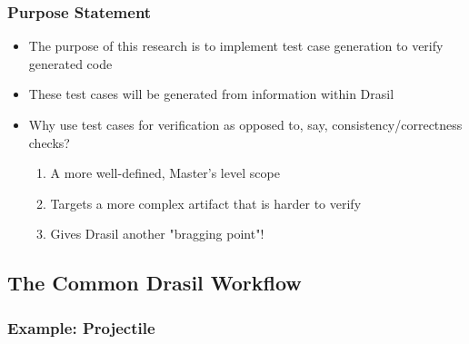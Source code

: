 \documentclass{beamer}
\begin{document}
\begin{frame}
    \frametitle{Purpose Statement}
    \begin{itemize}
        \item The purpose of this research is to implement test case generation
              to verify generated code
        \item These test cases will be generated from information within Drasil
        \item<2-> Why use test cases for verification as opposed to, say,
            consistency/correctness checks?
            \begin{enumerate}
                \item<3-> A more well-defined, Master's level scope
                \item<4-> Targets a more complex artifact that is harder to verify
                \item<5-> Gives Drasil another "bragging point"!
            \end{enumerate}
    \end{itemize}
\end{frame}


\subsection{The Common Drasil Workflow}
\subsubsection*{Example: Projectile}
\end{document}
